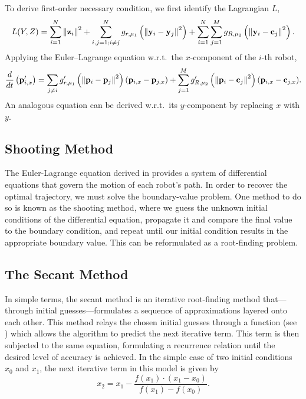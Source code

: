 \documentclass[11pt]{article}
\begin{document}
To derive first-order necessary condition, we first identify the Lagrangian \(L\),
\begin{equation}
    L(Y,Z) = \sum_{i=1}^{N} \left\lVert \mathbf{z}_i \right\rVert^2 + \sum_{i,j = 1; i \neq j}^{N} g_{r,\mu_1}\left( \left\lVert \mathbf{y}_i - \mathbf{y}_j \right\rVert^2 \right) + \sum_{i=1}^{N} \sum_{j=1}^{M} g_{R,\mu_2}\left( \left\lVert \mathbf{y}_i - \mathbf{c}_j \right\rVert^2 \right).
\end{equation}
Applying the Euler--Lagrange equation w.r.t.\ the \(x\)-component of the \(i\)-th robot,
\begin{equation}
    \frac{d}{dt}\left(\mathbf{p}'_{i,x}\right) = \sum_{j \neq i} g'_{r,\mu_1}\left( \left\lVert \mathbf{p}_i - \mathbf{p}_j \right\rVert^2 \right) (\mathbf{p}_{i,x} - \mathbf{p}_{j,x}) + \sum_{j=1}^{M} g'_{R,\mu_2}\left( \left\lVert \mathbf{p}_i - \mathbf{c}_j \right\rVert^2 \right) (\mathbf{p}_{i,x} - \mathbf{c}_{j,x}).
    \label{eq:EL}
\end{equation}
An analogous equation can be derived w.r.t.\ its \(y\)-component by replacing \(x\) with \(y\).

\subsection{Shooting Method}

The Euler-Lagrange equation derived in  provides a system of differential equations that govern the motion of each robot's path. In order to recover the optimal trajectory, we must solve the boundary-value problem. One method to do so is known as the shooting method, where we guess the unknown initial conditions of the differential equation, propagate it and compare the final value to the boundary condition, and repeat until our initial condition results in the appropriate boundary value. This can be reformulated as a root-finding problem.

\subsection{The Secant Method}

In simple terms, the secant method is an iterative root-finding method that---through initial guesses---formulates a sequence of approximations layered onto each other. This method relays the chosen initial guesses through a function (see ) which allows the algorithm to predict the next iterative term. This term is then subjected to the same equation, formulating a recurrence relation until the desired level of accuracy is achieved. In the simple case of two initial conditions \(x_0\) and \(x_1\), the next iterative term in this model is given by 
\begin{equation}
	x_2 = x_1 - \frac{f(x_1) \cdot (x_1 - x_0)}{f(x_1) - f(x_0)}.
	\label{eq:secant}
\end{equation}
\end{document}
